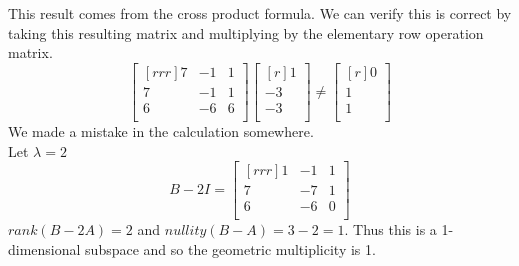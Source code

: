 \documentclass{report}
\theoremstyle{plain}
\theoremstyle{definition}
\theoremstyle{plain}
\begin{document}
This result comes from the cross product formula. We can verify this is correct by taking this resulting matrix and multiplying by the elementary row operation matrix.
\[ \begin{bmatrix}[rrr]7&-1&1\\7&-1&1\\6&-6&6\\\end{bmatrix}\begin{bmatrix}[r]1\\-3\\-3\\\end{bmatrix}\neq \begin{bmatrix}[r]0\\1\\1\\\end{bmatrix} \]
We made a mistake in the calculation somewhere.\\
Let $\lambda=2$
\[ B-2I=\begin{bmatrix}[rrr]1&-1&1\\7&-7&1\\6&-6&0\\\end{bmatrix} \]
$rank(B-2A)=2$ and $nullity(B-A)=3-2=1$. Thus this is a 1-dimensional subspace and so the geometric multiplicity is 1.
\end{document}
